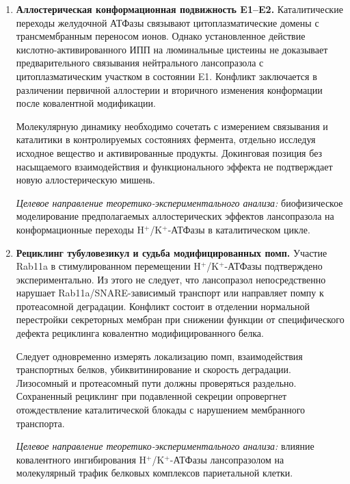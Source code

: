 \documentclass[11pt,a4paper,notitlepage]{report}
\newcommand{\src}[1]{\unskip\space\cite{#1}}
\begin{document}
\begin{enumerate}[label=\textbf{\arabic*.},leftmargin=*,itemsep=0.9\baselineskip]
\textit{Целевое направление теоретико-экспериментального анализа:} кинетика эндогенного восстановления дисульфидных связей H$^+$/K$^+$-АТФазы после ковалентной блокады лансопразолом.

\item \textbf{Аллостерическая конформационная подвижность E1--E2.} Каталитические переходы желудочной АТФазы связывают цитоплазматические домены с трансмембранным переносом ионов. Однако установленное действие кислотно-активированного ИПП на люминальные цистеины не доказывает предварительного связывания нейтрального лансопразола с цитоплазматическим участком в состоянии E1. Конфликт заключается в различении первичной аллостерии и вторичного изменения конформации после ковалентной модификации.\src{molstructure,molchem,molcys}

Молекулярную динамику необходимо сочетать с измерением связывания и каталитики в контролируемых состояниях фермента, отдельно исследуя исходное вещество и активированные продукты. Докинговая позиция без насыщаемого взаимодействия и функционального эффекта не подтверждает новую аллостерическую мишень.

\textit{Целевое направление теоретико-экспериментального анализа:} биофизическое моделирование предполагаемых аллостерических эффектов лансопразола на конформационные переходы H$^+$/K$^+$-АТФазы в каталитическом цикле.

\item \textbf{Рециклинг тубуловезикул и судьба модифицированных помп.} Участие Rab11a в стимулированном перемещении H$^+$/K$^+$-АТФазы подтверждено экспериментально. Из этого не следует, что лансопразол непосредственно нарушает Rab11a/SNARE-зависимый транспорт или направляет помпу к протеасомной деградации. Конфликт состоит в отделении нормальной перестройки секреторных мембран при снижении функции от специфического дефекта рециклинга ковалентно модифицированного белка.\src{futurerab1999,molstructure}

Следует одновременно измерять локализацию помп, взаимодействия транспортных белков, убиквитинирование и скорость деградации. Лизосомный и протеасомный пути должны проверяться раздельно. Сохраненный рециклинг при подавленной секреции опровергнет отождествление каталитической блокады с нарушением мембранного транспорта.

\textit{Целевое направление теоретико-экспериментального анализа:} влияние ковалентного ингибирования H$^+$/K$^+$-АТФазы лансопразолом на молекулярный трафик белковых комплексов париетальной клетки.

\end{enumerate}
\end{document}
